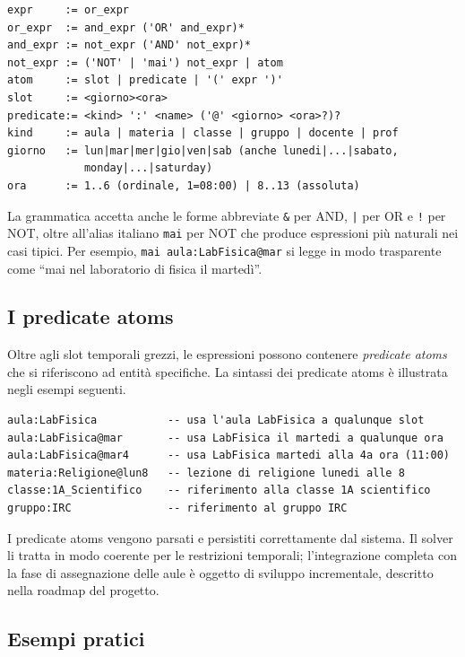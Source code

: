\begin{lstlisting}[basicstyle=\ttfamily\small]
expr     := or_expr
or_expr  := and_expr ('OR' and_expr)*
and_expr := not_expr ('AND' not_expr)*
not_expr := ('NOT' | 'mai') not_expr | atom
atom     := slot | predicate | '(' expr ')'
slot     := <giorno><ora>
predicate:= <kind> ':' <name> ('@' <giorno> <ora>?)?
kind     := aula | materia | classe | gruppo | docente | prof
giorno   := lun|mar|mer|gio|ven|sab (anche lunedi|...|sabato,
            monday|...|saturday)
ora      := 1..6 (ordinale, 1=08:00) | 8..13 (assoluta)
\end{lstlisting}

La grammatica accetta anche le forme abbreviate \texttt{\&}
per AND, \texttt{|} per OR e \texttt{!} per NOT, oltre
all'alias italiano \texttt{mai} per NOT che produce
espressioni pi\`u naturali nei casi tipici. Per esempio,
\texttt{mai aula:LabFisica@mar} si legge in modo
trasparente come ``mai nel laboratorio di fisica il
marted\`i''.

\subsection{I predicate atoms}

Oltre agli slot temporali grezzi, le espressioni possono
contenere \emph{predicate atoms} che si riferiscono ad
entit\`a specifiche. La sintassi dei predicate atoms \`e
illustrata negli esempi seguenti.

\begin{lstlisting}[basicstyle=\ttfamily\small]
aula:LabFisica           -- usa l'aula LabFisica a qualunque slot
aula:LabFisica@mar       -- usa LabFisica il martedi a qualunque ora
aula:LabFisica@mar4      -- usa LabFisica martedi alla 4a ora (11:00)
materia:Religione@lun8   -- lezione di religione lunedi alle 8
classe:1A_Scientifico    -- riferimento alla classe 1A scientifico
gruppo:IRC               -- riferimento al gruppo IRC
\end{lstlisting}

I predicate atoms vengono parsati e persistiti correttamente
dal sistema. Il solver li tratta in modo coerente per le
restrizioni temporali; l'integrazione completa con la fase
di assegnazione delle aule \`e oggetto di sviluppo
incrementale, descritto nella roadmap del progetto.

\subsection{Esempi pratici}

